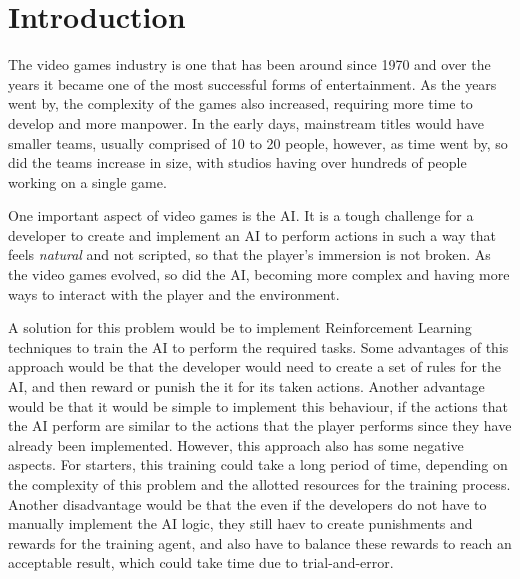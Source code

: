 \chapter{Introduction}

The video games industry is one that has been around since 1970 and over the years it became one of the most successful forms of entertainment. As the years went by, the complexity of the games also increased, requiring more time to develop and more manpower. In the early days, mainstream titles would have smaller teams, usually comprised of 10 to 20 people, however, as time went by, so did the teams increase in size, with studios having over hundreds of people working on a single game.

One important aspect of video games is the AI. It is a tough challenge for a developer to create and implement an AI to perform actions in such a way that feels \emph{natural} and not scripted, so that the player's immersion is not broken. As the video games evolved, so did the AI, becoming more complex and having more ways to interact with the player and the environment.

A solution for this problem would be to implement Reinforcement Learning techniques to train the AI to perform the required tasks. Some advantages of this approach would be that the developer would need to create a set of rules for the AI, and then reward or punish the it for its taken actions. Another advantage would be that it would be simple to implement this behaviour, if the actions that the AI perform are similar to the actions that the player performs since they have already been implemented. However, this approach also has some negative aspects. For starters, this training could take a long period of time, depending on the complexity of this problem and the allotted resources for the training process. Another disadvantage would be that the even if the developers do not have to manually implement the AI logic, they still haev to create punishments and rewards for the training agent, and also have to balance these rewards to reach an acceptable result, which could take time due to trial-and-error.

%
